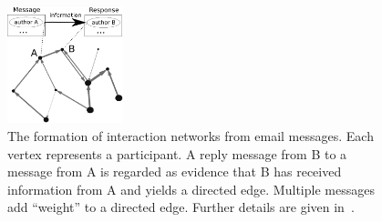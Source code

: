 \documentclass[%
 aip,
 jmp,%
 amsmath,amssymb,
 reprint,%
]{revtex4-1}
\begin{document}
\begin{figure}[!h]
	\centering
	\includegraphics[width=0.3\textwidth]{figs/criaRede__}
	\caption{The formation of interaction networks from email messages. Each vertex represents a participant. A reply message from B to a message from A is regarded as evidence that B has received information from A and yields a directed edge. Multiple messages add ``weight'' to a directed edge. Further details are given in~\cite{evoSN}.}
	\label{fig:formation}
\end{figure}


%

\end{document}
